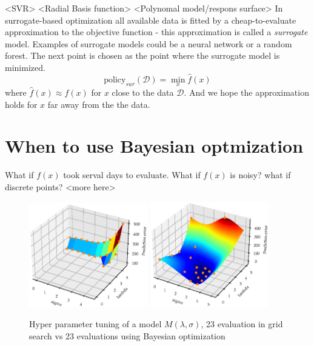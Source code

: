 \begin{testexample}
    <SVR> <Radial Basis function> <Polynomal model/respons surface>
    In surrogate-based optimization all available data is fitted by a cheap-to-evaluate approximation
    to the objective function - this approximation is called a \textit{surrogate} model. Examples
    of surrogate models could be a neural network or a random forest. The next point is 
    chosen as the point where the surrogate model is minimized. 
    $$\text{policy}_{sur}(\mathcal{D}) = \min_x \hat f(x)$$
    where $\hat f(x) \approx f(x)$ for $x$ close to the data $\mathcal{D}$. And we hope the approximation
    holds for $x$ far away from the the data. 
\end{testexample}

\section{When to use Bayesian optmization}
What if $f(x)$ took serval days to evaluate. What if $f(x)$ is noisy? what if discrete points? 
<more here>


\begin{figure}[H]%
    \centering
    {\includegraphics[width=0.46\textwidth]{Pictures/BO_vs_Grid2.eps} }%
    \qquad
   {\includegraphics[width=0.46\textwidth]{Pictures/BO_vs_Grid1.eps} }%
    \caption{Hyper parameter tuning of a model $M(\lambda, \sigma)$, 
    23 evaluation in grid search vs 23 evaluations using Bayesian optimization}%
    \label{fig:example}%
\end{figure}


